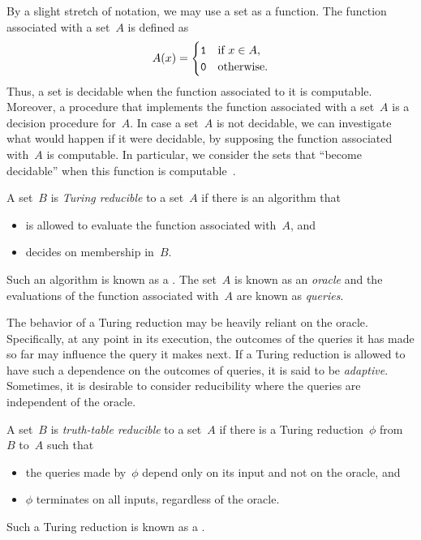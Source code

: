 By a slight stretch of notation, we may use a set as a function.
The function associated with a set~$A$ is defined as
\begin{equation*}
  A(x) = \begin{cases}
    \textnormal{\texttt{1}} & \text{if $x \in A$}, \\
    \textnormal{\texttt{0}} & \text{otherwise}.
  \end{cases}
\end{equation*}
Thus, a set is decidable when the function associated to it is computable.
Moreover, a procedure that implements the function associated with a set~$A$ is a decision procedure for~$A$.
In case a set~$A$ is not decidable, we can investigate what would happen if it were decidable, by supposing the function associated with~$A$ is computable.
In particular, we consider the sets that \enquote{become decidable} when this function is computable~\parencite{rogers1967theory,odifreddi1992classical,soare2016turing}.
\begin{definition}
\label{def:reduction:turing}%
  A set~$B$ is \emph{Turing reducible} to a set~$A$ if there is an algorithm that
  \begin{itemize}
  \item is allowed to evaluate the function associated with~$A$, and
  \item decides on membership in~$B$.
  \end{itemize}

  Such an algorithm is known as a .
  The set~$A$ is known as an \emph{oracle} and the evaluations of the function associated with~$A$ are known as \emph{queries}.
\end{definition}

The behavior of a Turing reduction may be heavily reliant on the oracle.
Specifically, at any point in its execution, the outcomes of the queries it has made so far may influence the query it makes next.
If a Turing reduction is allowed to have such a dependence on the outcomes of queries, it is said to be \emph{adaptive}.
Sometimes, it is desirable to consider reducibility where the queries are independent of the oracle.
\begin{definition}
\label{def:reduction:truth-table}%
  A set~$B$ is \emph{truth-table reducible} to a set~$A$ if there is a Turing reduction~$\phi$ from~$B$ to~$A$ such that
  \begin{itemize}
  \item the queries made by~$\phi$ depend only on its input and not on the oracle, and
  \item $\phi$ terminates on all inputs, regardless of the oracle.
  \end{itemize}

  Such a Turing reduction is known as a .
\end{definition}


